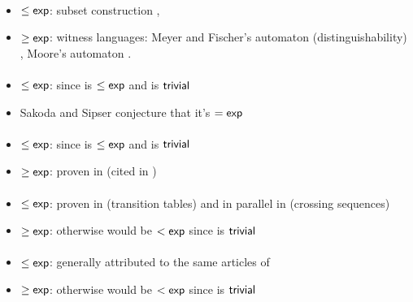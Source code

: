\paragraph{\ONFA{}\tto\ODFA}\label{cost:1NFAto1DFA}
\begin{itemize}
	\item $\le\mathsf{exp}$: subset construction \cite{RabSco59},
	\item $\ge\mathsf{exp}$: witness languages: Meyer and Fischer's automaton (distinguishability) \cite{MeyFis71}, Moore's automaton \cite{Moo71}.
\end{itemize}
\paragraph{\ONFA{}\tto\TDFA}
\begin{itemize}
	\item $\le\mathsf{exp}$: since \hyperref[cost:1NFAto1DFA]{\ONFA{}\tto\ODFA} is $\le\mathsf{exp}$ and \ODFA{}\tto\TDFA is $\mathsf{trivial}$
	\item Sakoda and Sipser conjecture that it's $=\mathsf{exp}$ \cite{SakSip78}
\end{itemize}
\paragraph{\TDFA{}\tto\ONFA}\label{cost:2DFAto1NFA}
\begin{itemize}
	\item $\le\mathsf{exp}$: since \hyperref[cost:1NFAto1DFA]{\ONFA{}\tto\ODFA} is $\le\mathsf{exp}$ and \ODFA{}\tto\ONFA is $\mathsf{trivial}$
	\item $\ge\mathsf{exp}$: proven in \cite{Bir93} (cited in \cite{PigPis14})
\end{itemize}
\paragraph{\TDFA{}\tto\ODFA}\label{cost:2DFAto1DFA}
\begin{itemize}
	\item $\le\mathsf{exp}$: proven in \cite{She59} (transition tables) and in parallel in \cite{RabSco59} (crossing sequences)
	\item $\ge\mathsf{exp}$: otherwise \hyperref[cost:2DFAto1NFA]{\TDFA{}\tto\ONFA} would be $<\mathsf{exp}$ since \ODFA{}\tto\ONFA is $\mathsf{trivial}$
\end{itemize}
\paragraph{\TNFA{}\tto\ODFA}\label{cost:2NFAto1DFA}
\begin{itemize}
	\item $\le\mathsf{exp}$: generally attributed to the same articles of \hyperref[cost:2DFAto1DFA]{\TDFA{}\tto\ODFA}
	\item $\ge\mathsf{exp}$: otherwise \hyperref[cost:1NFAto1DFA]{\ONFA{}\tto\ODFA} would be $<\mathsf{exp}$ since \ONFA{}\tto\TNFA is $\mathsf{trivial}$
\end{itemize}
